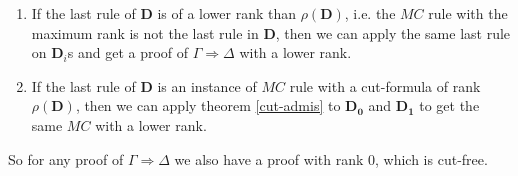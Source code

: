 \begin{enumerate}[label=\Roman*]
	\item If the last rule of $\mathbf{D}$ is of a lower rank than $\rho(\mathbf{D})$, i.e. the $MC$ rule with the maximum rank is not the last rule in $\mathbf{D}$, then we can apply the same last rule on $\mathbf{D}_i$s and get a proof of $\Gamma \Rightarrow \Delta$ with a lower rank.
	
	\item If the last rule of $\mathbf{D}$ is an instance of $MC$ rule with a cut-formula of rank $\rho(\mathbf{D})$, then we can apply theorem \ref{cut-admis} to $\mathbf{D_0}$ and $\mathbf{D_1}$ to get the same $MC$ with a lower rank.
\end{enumerate}
So for any proof of $\Gamma \Rightarrow \Delta$ we also have a proof with rank $0$, which is cut-free.